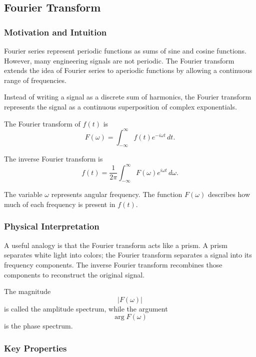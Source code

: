 \subsection{Fourier Transform}

\subsubsection*{Motivation and Intuition}

Fourier series represent periodic functions as sums of sine and cosine functions. However, many engineering signals are not periodic. The Fourier transform extends the idea of Fourier series to aperiodic functions by allowing a continuous range of frequencies.

Instead of writing a signal as a discrete sum of harmonics, the Fourier transform represents the signal as a continuous superposition of complex exponentials.

\begin{conceptbox}
    The Fourier transform of $f(t)$ is
    \[
        F(\omega)=\int_{-\infty}^{\infty} f(t)e^{-i\omega t}\,dt.
    \]

    The inverse Fourier transform is
    \[
        f(t)=\frac{1}{2\pi}\int_{-\infty}^{\infty}F(\omega)e^{i\omega t}\,d\omega.
    \]
\end{conceptbox}

The variable $\omega$ represents angular frequency. The function $F(\omega)$ describes how much of each frequency is present in $f(t)$.

\subsubsection*{Physical Interpretation}

\begin{noteBox}
    A useful analogy is that the Fourier transform acts like a prism. A prism separates white light into colors; the Fourier transform separates a signal into its frequency components. The inverse Fourier transform recombines those components to reconstruct the original signal.
\end{noteBox}

The magnitude
\[
    |F(\omega)|
\]
is called the amplitude spectrum, while the argument
\[
    \arg F(\omega)
\]
is the phase spectrum.

\subsubsection*{Key Properties}

